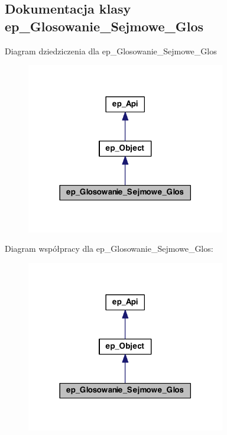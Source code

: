 \hypertarget{classep___glosowanie___sejmowe___glos}{\subsection{Dokumentacja klasy ep\-\_\-\-Glosowanie\-\_\-\-Sejmowe\-\_\-\-Glos}
\label{classep___glosowanie___sejmowe___glos}
}


Diagram dziedziczenia dla ep\-\_\-\-Glosowanie\-\_\-\-Sejmowe\-\_\-\-Glos\nopagebreak
\begin{figure}[H]
\begin{center}
\leavevmode
\includegraphics[width=246pt]{classep___glosowanie___sejmowe___glos__inherit__graph}
\end{center}
\end{figure}


Diagram współpracy dla ep\-\_\-\-Glosowanie\-\_\-\-Sejmowe\-\_\-\-Glos\-:\nopagebreak
\begin{figure}[H]
\begin{center}
\leavevmode
\includegraphics[width=246pt]{classep___glosowanie___sejmowe___glos__coll__graph}
\end{center}
\end{figure}
